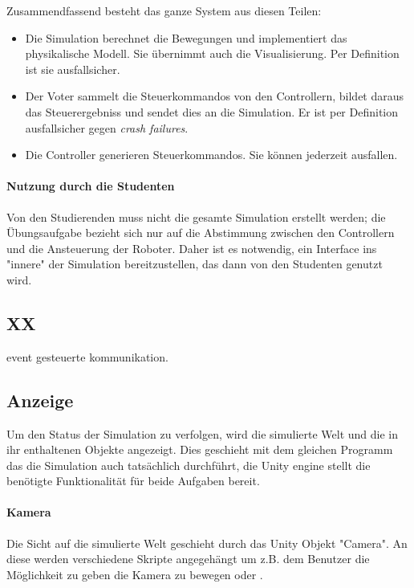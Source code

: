 Zusammendfassend besteht das ganze System aus diesen Teilen:
\begin{itemize}
	\item Die Simulation berechnet die Bewegungen und implementiert das physikalische Modell. Sie {\"{u}}bernimmt auch die Visualisierung. Per Definition ist sie ausfallsicher.
	\item Der Voter sammelt die Steuerkommandos von den Controllern, bildet daraus das Steuerergebniss und sendet dies an die Simulation. Er ist per Definition ausfallsicher gegen \textit{crash failures}.
	\item Die Controller generieren Steuerkommandos. Sie k{\"{o}}nnen jederzeit ausfallen.
\end{itemize}

\paragraph{Nutzung durch die Studenten} Von den Studierenden muss nicht die gesamte Simulation erstellt werden; die {\"{U}}bungsaufgabe bezieht sich nur auf die Abstimmung zwischen den Controllern und die Ansteuerung der Roboter.
Daher ist es notwendig, ein Interface ins "innere" der Simulation bereitzustellen, das dann von den Studenten genutzt wird.

\subsection{XX}
event gesteuerte kommunikation.

\subsection{Anzeige}\label{graphics}
Um den Status der Simulation zu verfolgen, wird die simulierte Welt und die in ihr enthaltenen Objekte angezeigt. Dies geschieht mit dem gleichen Programm das die Simulation auch tats{\"{a}}chlich
durchf{\"{u}}hrt, die Unity engine stellt die ben{\"{o}}tigte Funktionalit{\"{a}}t f{\"{u}}r beide Aufgaben bereit.

\paragraph{Kamera} Die Sicht auf die simulierte Welt geschieht durch das Unity Objekt "Camera". An diese werden verschiedene Skripte angegeh{\"{a}}ngt um z.B. dem Benutzer die M{\"{o}}glichkeit zu
geben die Kamera zu bewegen oder .

